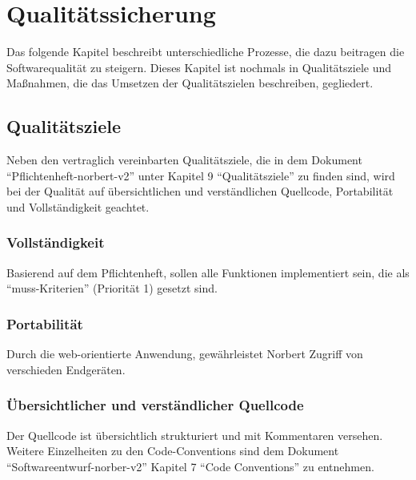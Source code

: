 
\chapter{Qualitätssicherung}
Das folgende Kapitel beschreibt unterschiedliche Prozesse, die dazu beitragen die Softwarequalität zu steigern. 
Dieses Kapitel ist nochmals in Qualitätsziele und Maßnahmen, die das Umsetzen der Qualitätszielen beschreiben, gegliedert.

\section{Qualitätsziele}
Neben den vertraglich vereinbarten Qualitätsziele, die in dem Dokument \enquote{Pflichtenheft-norbert-v2} unter Kapitel 9 \enquote{Qualitätsziele} zu finden sind, wird bei der Qualität auf übersichtlichen und verständlichen Quellcode, Portabilität und Vollständigkeit geachtet.

\subsection{Vollständigkeit}
Basierend auf dem Pflichtenheft, sollen alle Funktionen implementiert sein, die als \enquote{muss-Kriterien} (Priorität 1) gesetzt sind.

\subsection{Portabilität}
Durch die web-orientierte Anwendung, gewährleistet Norbert Zugriff von verschieden Endgeräten. 

\subsection{Übersichtlicher und verständlicher Quellcode}
Der Quellcode ist übersichtlich strukturiert und mit Kommentaren versehen. Weitere Einzelheiten zu den Code-Conventions sind dem Dokument \enquote{Softwareentwurf-norber-v2} Kapitel 7 \enquote{Code Conventions} zu entnehmen.


